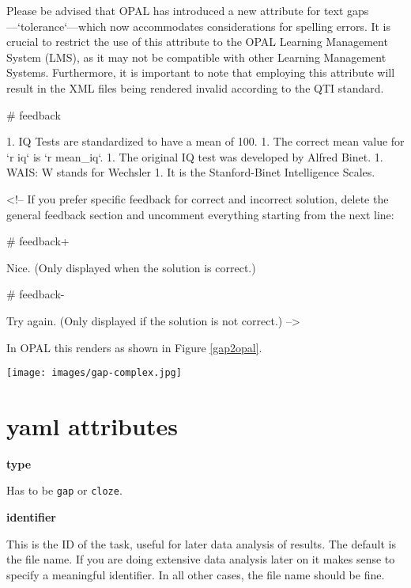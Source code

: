 \documentclass[twoside]{tufte-book}
\newenvironment{Shaded}{}{}
\begin{document}
\begin{Shaded}
\begin{Highlighting}
Please be advised that OPAL has introduced a new attribute for text
gaps—`tolerance`—which now accommodates considerations for spelling errors. It
is crucial to restrict the use of this attribute to the OPAL Learning Management
System (LMS), as it may not be compatible with other Learning Management
Systems. Furthermore, it is important to note that employing this attribute will
result in the XML files being rendered invalid according to the QTI standard.

# feedback

1. IQ Tests are standardized to have a mean of 100.
1. The correct mean value for `r iq` is `r mean_iq`.
1. The original IQ test was developed by Alfred Binet.
1. WAIS: W stands for Wechsler
1. It is the Stanford-Binet Intelligence Scales.

<!-- If you prefer specific feedback for correct and incorrect solution, delete
the general feedback section and uncomment everything starting from the next
line:

# feedback+

Nice. (Only displayed when the solution is correct.)

# feedback-

Try again. (Only displayed if the solution is not correct.)
-->
\end{Highlighting}
\end{Shaded}

In OPAL this renders as shown in Figure \ref{gap2opal}.

\begin{figure*}
\centering
\texttt{[image: images/gap-complex.jpg]}
\caption{\label{gap2opal}Preview of complex gap task in OPAL}
\end{figure*}

\section{yaml attributes}\label{yaml-attributes-2}

\noindent\textbf{type}\label{type-2}

Has to be \texttt{gap} or \texttt{cloze}.

\noindent\textbf{identifier}\label{identifier-2}

This is the ID of the task, useful for later data analysis of results. The default is the file name. If you are doing extensive data analysis later on it makes sense to
specify a meaningful identifier. In all other cases, the file name should be
fine.
\end{document}
